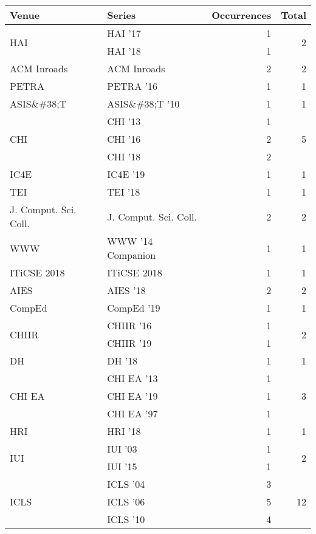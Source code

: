 \begin{table*}[t]
\begin{tabular}{llrr}
Venue & Series & Occurrences & Total\\\hline
\multirow{2}{*}{HAI } & HAI '17 & 1 & \multirow{2}{*}{2}\\
& HAI '18 & 1 &\\
\multirow{1}{*}{ACM Inroads} & ACM Inroads & 2 & \multirow{1}{*}{2}\\
\multirow{1}{*}{PETRA } & PETRA '16 & 1 & \multirow{1}{*}{1}\\
\multirow{1}{*}{ASIS\&\#38;T } & ASIS\&\#38;T '10 & 1 & \multirow{1}{*}{1}\\
\multirow{3}{*}{CHI } & CHI '13 & 1 & \multirow{3}{*}{5}\\
& CHI '16 & 2 &\\
& CHI '18 & 2 &\\
\multirow{1}{*}{IC4E } & IC4E '19 & 1 & \multirow{1}{*}{1}\\
\multirow{1}{*}{TEI } & TEI '18 & 1 & \multirow{1}{*}{1}\\
\multirow{1}{*}{J. Comput. Sci. Coll.} & J. Comput. Sci. Coll. & 2 & \multirow{1}{*}{2}\\
\multirow{1}{*}{WWW } & WWW '14 Companion & 1 & \multirow{1}{*}{1}\\
\multirow{1}{*}{ITiCSE 2018} & ITiCSE 2018 & 1 & \multirow{1}{*}{1}\\
\multirow{1}{*}{AIES } & AIES '18 & 2 & \multirow{1}{*}{2}\\
\multirow{1}{*}{CompEd } & CompEd '19 & 1 & \multirow{1}{*}{1}\\
\multirow{2}{*}{CHIIR } & CHIIR '16 & 1 & \multirow{2}{*}{2}\\
& CHIIR '19 & 1 &\\
\multirow{1}{*}{DH } & DH '18 & 1 & \multirow{1}{*}{1}\\
\multirow{3}{*}{CHI EA } & CHI EA '13 & 1 & \multirow{3}{*}{3}\\
& CHI EA '19 & 1 &\\
& CHI EA '97 & 1 &\\
\multirow{1}{*}{HRI } & HRI '18 & 1 & \multirow{1}{*}{1}\\
\multirow{2}{*}{IUI } & IUI '03 & 1 & \multirow{2}{*}{2}\\
& IUI '15 & 1 &\\
\multirow{3}{*}{ICLS } & ICLS '04 & 3 & \multirow{3}{*}{12}\\
& ICLS '06 & 5 &\\
& ICLS '10 & 4 &\\

\end{tabular}
\end{table*}
